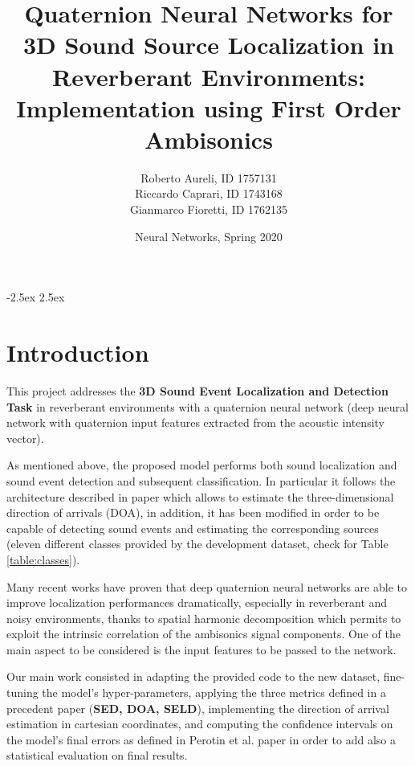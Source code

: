 \documentclass[11pt]{article}
\title{Quaternion Neural Networks for 3D Sound Source Localization in Reverberant Environments: Implementation using First Order Ambisonics}
\author{Roberto Aureli, ID 1757131\\
		Riccardo Caprari, ID 1743168\\
		Gianmarco Fioretti, ID 1762135}
\date{Neural Networks, Spring 2020}
\begin{document}
\maketitle

\vspace{10px}

\openup -2.5ex
\tableofcontents
\openup 2.5ex

\newpage
\section{Introduction}\label{cha:intro}

This project addresses the \textbf{3D Sound Event Localization and Detection Task} in reverberant environments with a  quaternion neural network (deep neural network with quaternion input features extracted from the acoustic intensity vector).\newline

\noindent
As mentioned above, the proposed model performs both sound localization and sound event detection and subsequent classification. In particular it follows the architecture described in paper \cite{paper2020} which allows to estimate the three-dimensional direction of arrivals (DOA), in addition, it has been modified in order to be capable of detecting sound events and estimating the corresponding sources (eleven different classes provided by the development dataset, check for Table \ref{table:classes}).\newline

\noindent
Many recent works have proven that deep quaternion neural networks are able to improve localization performances dramatically, especially in reverberant and noisy environments, thanks to spatial harmonic decomposition which permits to exploit the intrinsic correlation of the ambisonics signal components. One of the main aspect to be considered is the input features to be passed to the network.\newline

\noindent
Our main work consisted in adapting the provided code to the new dataset, fine-tuning the model's hyper-parameters, applying the three metrics defined in a precedent paper \cite{paper2019} (\textbf{SED, DOA, SELD}), implementing the direction of arrival estimation in cartesian coordinates, and computing the confidence intervals on the model's final errors as defined in Perotin et al. paper \cite{paper2018} in order to add also a statistical evaluation on final results.
\end{document}
